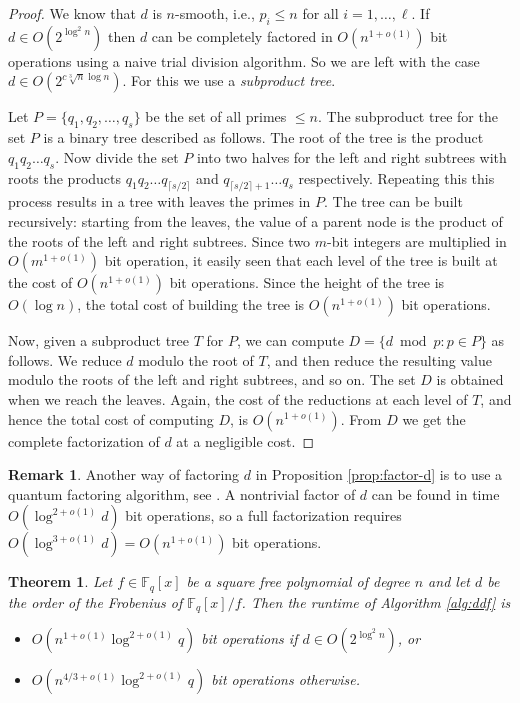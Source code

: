 \documentclass{article}
\theoremstyle{plain}
\newtheorem{theorem}{Theorem}
\theoremstyle{definition}
\newtheorem*{remark}{Remark}
\def\F{\ensuremath{\mathbb{F}}}
\begin{document}
\begin{proof}
	We know that $d$ is $n$-smooth, i.e., $p_i \le n$ for all $i = 1, \dots, \ell$. If $d \in 
	O(2^{\log^2n})$ then $d$ can be completely factored in $O(n^{1 + o(1)})$ bit operations using a 
	naive trial division algorithm. So we are left with the case $d \in O(2^{c\sqrt[3]{n} \log 
	n})$. For this we use a \textit{subproduct tree}.
	
	Let $P = \{ q_1, q_2, \dots, q_s \}$ be the set of all primes $\le n$. The subproduct tree for 
	the set $P$ is a binary tree described as follows. The root of the tree is the product $q_1 q_2 
	\dots q_s$. Now divide the set $P$ into two halves for the left and right subtrees with roots 
	the products $q_1 q_2 \dots q_{\lceil s / 2 \rceil}$ and $q_{\lceil s / 2 \rceil + 1} \dots q_s$ 
	respectively. Repeating this this process results in a tree with leaves the primes in $P$. The 
	tree can be built recursively: starting from the leaves, the value of a parent node is the 
	product of the roots of the left and right subtrees. Since two $m$-bit integers are multiplied 
	in $O(m^{1 + o(1)})$ bit operation, it easily seen that each level of the tree is built at the 
	cost of $O(n^{1 + o(1)})$ bit operations. Since the height of the tree is $O(\log n)$, the 
	total cost of building the tree is $O(n^{1 + o(1)})$ bit operations.
	
	Now, given a subproduct tree $T$ for $P$, we can compute $D = \{ d \bmod p : p \in P \}$ as 
	follows. We reduce $d$ modulo the root of $T$, and then reduce the resulting value modulo the 
	roots of the left and right subtrees, and so on. The set $D$ is obtained when we reach the 
	leaves. Again, the cost of the reductions at each level of $T$, and hence the total cost of 
	computing $D$, is $O(n^{1 + o(1)})$. From $D$ we get the complete factorization of $d$ at a 
	negligible cost.
\end{proof}
\begin{remark}
	Another way of factoring $d$ in Proposition \ref{prop:factor-d} is to use a quantum factoring 
	algorithm, see \cite{kaye2007introduction}. A nontrivial factor of $d$ can be found in time 
	$O(\log^{2 + o(1)}d)$ bit operations, so a full factorization requires $O(\log^{3 + o(1)}d) 
	= O(n^{1 + o(1)})$ bit operations. 
\end{remark}
\begin{theorem}\label{thm:alg-ddf}
	Let $f \in \F_q[x]$ be a square free polynomial of degree $n$ and let $d$ be the order of the 
	Frobenius of $\F_q[x] / f$. Then the runtime of Algorithm \ref{alg:ddf} is
	\begin{itemize}
		\item $O(n^{1 + o(1)} \log^{2 + o(1)}q)$ bit operations if $d \in O(2^{\log^2n})$, or
		\item $O(n^{4 / 3 + o(1)} \log^{2 + o(1)}q)$ bit operations otherwise.
	\end{itemize}
\end{theorem}
\end{document}
